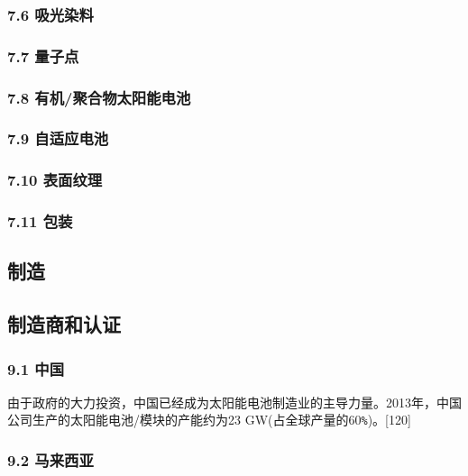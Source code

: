 \subsubsection{7.6 吸光染料}



\subsubsection{7.7 量子点}



\subsubsection{7.8 有机/聚合物太阳能电池}



\subsubsection{7.9 自适应电池}



\subsubsection{7.10 表面纹理}



\subsubsection{7.11 包装}



\subsection{制造}



\subsection{制造商和认证}



\subsubsection{9.1 中国}

由于政府的大力投资，中国已经成为太阳能电池制造业的主导力量。2013年，中国公司生产的太阳能电池/模块的产能约为23 GW(占全球产量的60\verb|%|)。[120]

\subsubsection{9.2 马来西亚}

